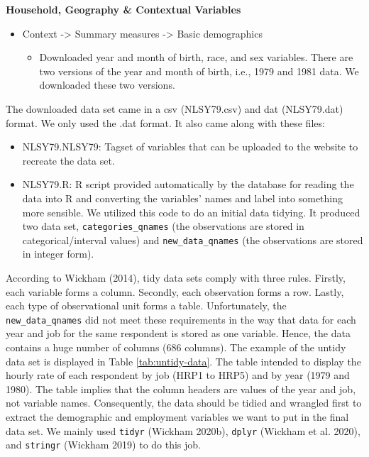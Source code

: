 \documentclass{article}
\begin{document}
\textbf{Household, Geography \& Contextual Variables}

\begin{itemize}
\tightlist
\item
  Context -\textgreater{} Summary measures -\textgreater{} Basic demographics

  \begin{itemize}
  \tightlist
  \item
    Downloaded year and month of birth, race, and sex variables.
    There are two versions of the year and month of birth, i.e., 1979 and 1981 data. We downloaded these two versions.
  \end{itemize}
\end{itemize}

The downloaded data set came in a csv (NLSY79.csv) and dat (NLSY79.dat) format. We only used the .dat format. It also came along with these files:

\begin{itemize}
\tightlist
\item
  NLSY79.NLSY79: Tagset of variables that can be uploaded to the website to recreate the data set.
\item
  NLSY79.R: R script provided automatically by the database for reading the data into R and converting the variables' names and label into something more sensible. We utilized this code to do an initial data tidying. It produced two data set, \texttt{categories\_qnames} (the observations are stored in categorical/interval values) and \texttt{new\_data\_qnames} (the observations are stored in integer form).
\end{itemize}

According to Wickham (2014), tidy data sets comply with three rules. Firstly, each variable forms a column. Secondly, each observation forms a row. Lastly, each type of observational unit forms a table. Unfortunately, the \texttt{new\_data\_qnames} did not meet these requirements in the way that data for each year and job for the same respondent is stored as one variable. Hence, the data contains a huge number of columns (686 columns). The example of the untidy data set is displayed in Table \ref{tab:untidy-data}. The table intended to display the hourly rate of each respondent by job (HRP1 to HRP5) and by year (1979 and 1980). The table implies that the column headers are values of the year and job, not variable names. Consequently, the data should be tidied and wrangled first to extract the demographic and employment variables we want to put in the final data set. We mainly used \texttt{tidyr} (Wickham 2020b), \texttt{dplyr} (Wickham et al. 2020), and \texttt{stringr} (Wickham 2019) to do this job.
\end{document}
